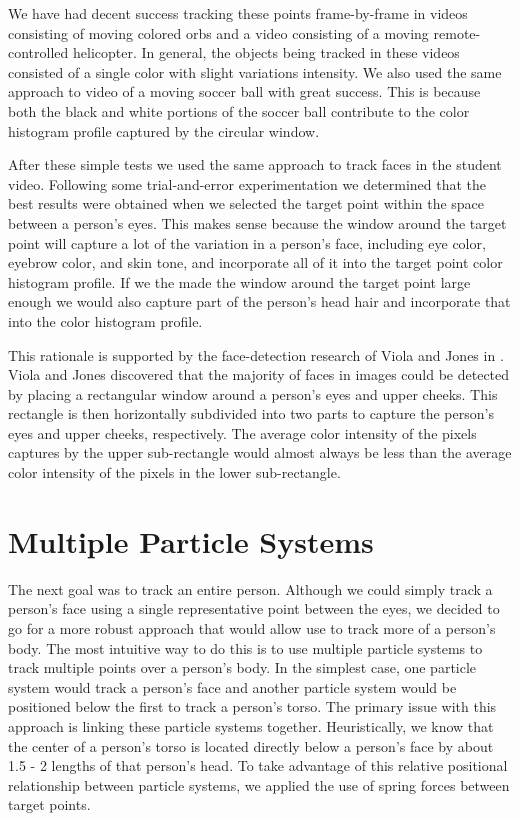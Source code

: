 \documentclass[12pt]{article}
\begin{document}
We have had decent success tracking these points frame-by-frame in videos consisting of moving colored orbs and a video consisting of a moving remote-controlled helicopter. In general, the objects being tracked in these videos consisted of a single color with slight variations intensity. We also used the same approach to video of a moving soccer ball with great success. This is because both the black and white portions of the soccer ball contribute to the color histogram profile captured by the circular window.

After these simple tests we used the same approach to track faces in the student video. Following some trial-and-error experimentation we determined that the best results were obtained when we selected the target point within the space between a person's eyes. This makes sense because the window around the target point will capture a lot of the variation in a person's face, including eye color, eyebrow color, and skin tone, and incorporate all of it into the target point color histogram profile. If we the made the window around the target point large enough we would also capture part of the person's head hair and incorporate that into the color histogram profile. 

This rationale is supported by the face-detection research of Viola and Jones in \cite{facedetection}. Viola and Jones discovered that the majority of faces in images could be detected by placing a rectangular window around a person's eyes and upper cheeks. This rectangle is then horizontally subdivided into two parts to capture the person's eyes and upper cheeks, respectively. The average color intensity of the pixels captures by the upper sub-rectangle would almost always be less than the average color intensity of the pixels in the lower sub-rectangle.  



\section{Multiple Particle Systems}
\label{sec:multparticlesys}

The next goal was to track an entire person. Although we could simply track a person's face using a single representative point between the eyes, we decided to go for a more robust approach that would allow use to track more of a person's body. The most intuitive way to do this is to use multiple particle systems to track multiple points over a person's body. In the simplest case, one particle system would track a person's face and another particle system would be positioned below the first to track a person's torso. The primary issue with this approach is linking these particle systems together. Heuristically, we know that the center of a person's torso is located directly below a person's face by about 1.5 - 2 lengths of that person's head. To take advantage of this relative positional relationship between particle systems, we applied the use of spring forces between target points.
\end{document}
